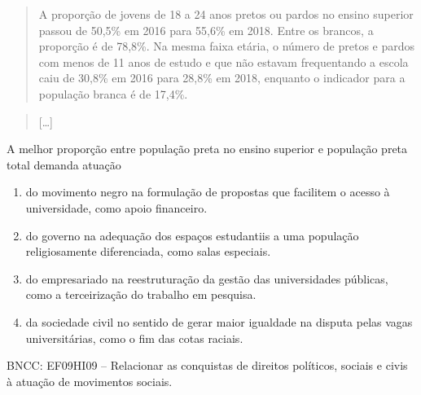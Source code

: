 \begin{quote}
A proporção de jovens de 18 a 24 anos pretos ou pardos no ensino
superior passou de 50,5\% em 2016 para 55,6\% em 2018. Entre os brancos,
a proporção é de 78,8\%. Na mesma faixa etária, o número de pretos e
pardos com menos de 11 anos de estudo e que não estavam frequentando a
escola caiu de 30,8\% em 2016 para 28,8\% em 2018, enquanto o indicador
para a população branca é de 17,4\%.
\end{quote}

\begin{quote}
{[}\ldots{}{]}
\end{quote}


A melhor proporção entre população preta no ensino superior e população
preta total demanda atuação

\begin{enumerate}
\def\labelenumi{\alph{enumi})}
\item
  do movimento negro na formulação de propostas que facilitem o acesso à
  universidade, como apoio financeiro.
\item
  do governo na adequação dos espaços estudantiis a uma população
  religiosamente diferenciada, como salas especiais.
\item
  do empresariado na reestruturação da gestão das universidades
  públicas, como a terceirização do trabalho em pesquisa.
\item
  da sociedade civil no sentido de gerar maior igualdade na disputa
  pelas vagas universitárias, como o fim das cotas raciais.
\end{enumerate}

BNCC: EF09HI09 -- Relacionar as conquistas de direitos políticos,
sociais e civis à atuação de movimentos sociais.

